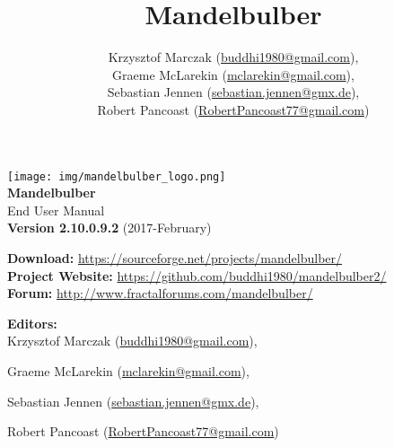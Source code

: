 % 
%




\newcommand{\mTitle}{Mandelbulber}
\newcommand{\mSubtitle}{End User Manual}
\newcommand{\mVersionDocument}{2.10.0.9.2}
\newcommand{\mDateDocument}{2017-February}
\newcommand{\mAuthor}{
	
Krzysztof Marczak (\href{mailto:buddhi1980@gmail.com}{buddhi1980@gmail.com}),

Graeme McLarekin (\href{mailto:mclarekin@gmail.com}{mclarekin@gmail.com}),

Sebastian Jennen (\href{mailto:sebastian.jennen@gmx.de}{sebastian.jennen@gmx.de}),

Robert Pancoast (\href{mailto:RobertPancoast77@gmail.com}{RobertPancoast77@gmail.com})}


\title{\mTitle}
\author{\mAuthor}




\begin{titlepage}
	\begin{center}
		\vspace{1.5cm}
			\texttt{[image: img/mandelbulber\_logo.png]} \\
		\vspace{0.5cm}
		\Huge\textbf{\mTitle}\\
		\Huge\mSubtitle\\
		\vspace{1.5cm}
		\large\textbf{Version \mVersionDocument} (\mDateDocument)\\
	\end{center}
	\normalsize
	\begin{flushleft}
			\textbf{Download:} \url{https://sourceforge.net/projects/mandelbulber/}\\
			\textbf{Project Website:} \url{https://github.com/buddhi1980/mandelbulber2/}\\
			\textbf{Forum:} \url{http://www.fractalforums.com/mandelbulber/}\\
	\end{flushleft}
	\vspace{2cm}
	\textbf{Editors:}\\
	\mAuthor\\
	\vfill
\end{titlepage}

\setcounter{page}{1}
\tableofcontents
\newpage


\setcounter{page}{1}






